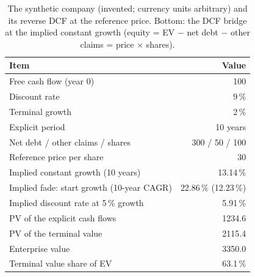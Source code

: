 \begin{table}[H]
\centering
\small
\caption{The synthetic company (invented; currency units arbitrary) and its reverse DCF at the reference price. Bottom: the DCF bridge at the implied constant growth (equity = EV $-$ net debt $-$ other claims = price $\times$ shares).}
\label{tab:D1_dcf}
\begin{tabular}{lr}
\toprule
Item & Value \\
\midrule
Free cash flow (year 0) & 100 \\
Discount rate & 9\,\% \\
Terminal growth & 2\,\% \\
Explicit period & 10 years \\
Net debt / other claims / shares & 300 / 50 / 100 \\
\midrule
Reference price per share & 30 \\
Implied constant growth (10 years) & 13.14\,\% \\
Implied fade: start growth (10-year CAGR) & 22.86\,\% (12.23\,\%) \\
Implied discount rate at 5\,\% growth & 5.91\,\% \\
\midrule
PV of the explicit cash flows & 1234.6 \\
PV of the terminal value & 2115.4 \\
Enterprise value & 3350.0 \\
Terminal value share of EV & 63.1\,\% \\
\bottomrule
\end{tabular}
\end{table}
